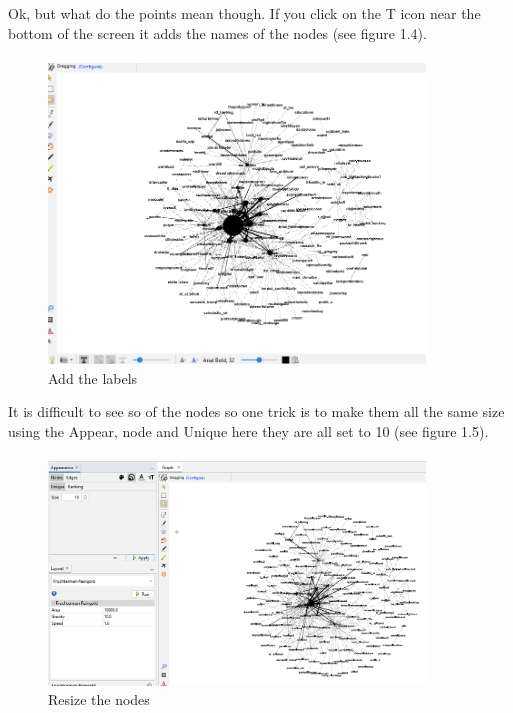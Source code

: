 Ok, but what do the points mean though. If you click on the T icon near the bottom of the screen it adds the names of the nodes (see figure 1.4).\paragraph{}
\begin{figure}
    \centering
    \includegraphics[width=10cm]{chapter/Chpsocioviz1/gephi5.png}
    \caption{Add the labels}
    \label{fig:addlabels}
\end{figure}
It is difficult to see so of the nodes so one trick is to make them all the same size using the Appear, node and Unique here they are all set to 10 (see figure 1.5).\paragraph{}
\begin{figure}
    \centering
    \includegraphics[width=10cm]{chapter/Chpsocioviz1/gephi6.png}
    \caption{Resize the nodes}
    \label{fig:nodes resize}
\end{figure}
